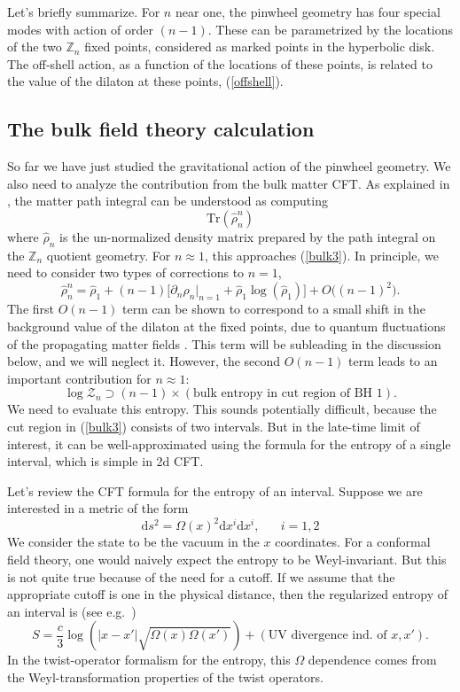 \documentclass[12pt]{article}
\newcommand{\be}{\begin{equation}}
\newcommand{\ee}{\end{equation}}
\numberwithin{equation}{section}
\def\tr{\text{Tr}}
\begin{document}
Let's briefly summarize. For $n$ near one, the pinwheel geometry has four special modes with action of order $(n-1)$. These can be parametrized by the locations of the two $\mathbb{Z}_n$ fixed points, considered as marked points in the hyperbolic disk. The off-shell action, as a function of the locations of these points, is related to the value of the dilaton at these points, (\ref{offshell}).

\subsection{The bulk field theory calculation}
So far we have just studied the gravitational action of the pinwheel geometry. We also need to analyze the contribution from the bulk matter CFT. As explained in \cite{Faulkner:2013ana}, the matter path integral can be understood as computing 
\be
\tr(\widehat{\rho}_n^n)
\ee
where $\widehat{\rho}_n$ is the un-normalized density matrix prepared by the path integral on the $\mathbb{Z}_n$ quotient geometry. For $n\approx 1$, this approaches (\ref{bulk3}). In principle, we need to consider two types of corrections to $n = 1$, 
\be
\widehat{\rho}_n^n = \widehat{\rho}_1 + (n-1)\big[\partial_n \widehat{\rho}_n|_{n = 1}+\widehat{\rho}_1\log(\widehat{\rho}_1)\big] + O\big((n-1)^2\big).
\ee
The first $O(n-1)$ term can be shown to correspond to a small shift in the background value of the dilaton at the fixed points, due to quantum fluctuations of the propagating matter fields \cite{Faulkner:2013ana,Dong:2017xht}. This term will be subleading in the discussion below, and we will neglect it. However, the second $O(n-1)$ term leads to an important contribution for $n\approx 1$:
\be
\log\mathcal{Z}_n \supset (n-1)\times (\text{bulk entropy in cut region of BH 1}).
\ee
We need to evaluate this entropy. This sounds potentially difficult, because the cut region in (\ref{bulk3}) consists of two intervals. But in the late-time limit of interest, it can be well-approximated \cite{Almheiri:2019yqk} using the formula for the entropy of a single interval, which is simple in 2d CFT.

Let's review the CFT formula for the entropy of an interval. Suppose we are interested in a metric of the form
\be
\mathrm{d}s^2 = \Omega(x)^2\mathrm{d}x^i \mathrm{d}x^i, \hspace{20pt} i = 1,2
\ee
We consider the state to be the vacuum in the $x$ coordinates. For a conformal field theory, one would naively expect the entropy to be Weyl-invariant. But this is not quite true because of the need for a cutoff. If we assume that the appropriate cutoff is one in the physical distance, then the regularized entropy of an interval is (see e.g.~\cite{Calabrese:2009qy})
\be
S = \frac{c}{3}\log\left(|x - x'|\sqrt{\Omega(x)\Omega(x')}\right) + (\text{UV divergence ind. of $x,x'$}).\label{entform}
\ee
In the twist-operator formalism for the entropy, this $\Omega$ dependence comes from the Weyl-transformation properties of the twist operators.
\end{document}
